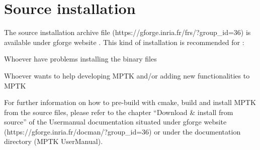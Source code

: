 \chapter{Source installation}

The source installation archive file (https://gforge.inria.fr/frs/?group\_id=36) is available under gforge website . 
This kind of installation is recommended for :
\begin{my_itemize}
	\item Whoever have problems installing the binary files
	\item Whoever wants to help developing MPTK and/or adding new functionalities to MPTK
\end{my_itemize}

For further information on how to pre-build with cmake, build and install MPTK from the source files, please refer to the chapter 
``Download \& install from source'' of the Usermanual documentation situated under gforge website (https://gforge.inria.fr/docman/?group\_id=36) 
or under the documentation directory (MPTK UserManual).